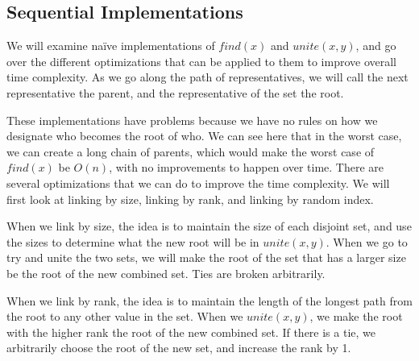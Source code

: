\documentclass[conference]{IEEEtran}
\begin{document}
\subsection{Sequential Implementations}

We will examine naïve implementations of $find(x)$ and $unite(x, y)$, and go over the different optimizations that can be applied to them to improve overall time complexity. As we go along the path of representatives, we will call the next representative the parent, and the representative of the set the root.





These implementations have problems because we have no rules on how we designate who becomes the root of who. We can see here that in the worst case, we can create a long chain of parents, which would make the worst case of $find(x)$ be $O(n)$, with no improvements to happen over time. There are several optimizations that we can do to improve the time complexity. We will first look at linking by size, linking by rank, and linking by random index.

When we link by size, the idea is to maintain the size of each disjoint set, and use the sizes to determine what the new root will be in $unite(x, y)$. When we go to try and unite the two sets, we will make the root of the set that has a larger size be the root of the new combined set. Ties are broken arbitrarily.



When we link by rank, the idea is to maintain the length of the longest path from the root to any other value in the set. When we $unite(x, y)$, we make the root with the higher rank the root of the new combined set. If there is a tie, we arbitrarily choose the root of the new set, and increase the rank by 1.


\end{document}
